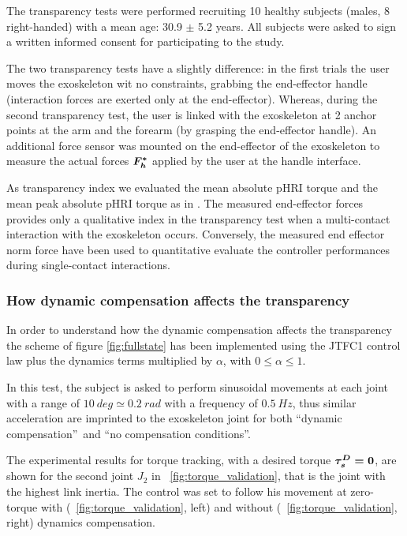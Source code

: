 The transparency tests were performed recruiting 10 healthy subjects (males, 8 right-handed) with a mean age: 30.9 $\pm$ 5.2 years. All  subjects were asked to sign a written informed consent for participating to the study.

The two transparency tests have a slightly difference: in the first trials the user moves  the exoskeleton wit no constraints, grabbing the end-effector handle (interaction forces are exerted only at the end-effector). Whereas, during the second transparency test, the user is linked with the exoskeleton at 2 anchor points at the  arm and the forearm (by grasping the end-effector handle).
An additional force sensor was mounted on the end-effector of the exoskeleton to measure the actual forces ${ \boldsymbol {F_h^*}}$  applied by the user at the handle interface. 

\par  As transparency index we evaluated the mean absolute pHRI torque and the mean peak absolute pHRI torque as in \cite{just2018exoskeleton}. The measured end-effector forces provides only a qualitative index in the transparency test when a multi-contact interaction with the exoskeleton occurs. Conversely, the measured end effector norm force have been used to quantitative evaluate the controller performances during single-contact interactions.

\subsubsection{How dynamic compensation affects the transparency} \label{subsubsec:compensationAndTransparency}

In order to understand how the dynamic compensation affects the transparency the scheme of figure \ref{fig:fullstate} has been implemented using the JTFC1 control law plus the dynamics terms multiplied by $\alpha$, with $0 \leq \alpha \leq 1$.

In this test, the subject is asked to perform sinusoidal movements at each joint with a range of $10 ~ deg \simeq 0.2 ~ rad $ with a frequency of $0.5 ~ Hz$, thus similar acceleration are imprinted to the exoskeleton joint for both \textquotedblleft dynamic compensation\textquotedblright \ and \textquotedblleft no compensation conditions\textquotedblright.

The experimental results for torque tracking, with a desired torque ${ \boldsymbol {\tau_s^D=0}}$, are shown for the second joint $J_2$ in \figurename \ \ref{fig:torque_validation}, that is the joint with the highest link inertia.  The control was set to follow his movement at zero-torque with (\figurename \ \ref{fig:torque_validation}, left) and without (\figurename \ \ref{fig:torque_validation}, right) dynamics compensation.
 

